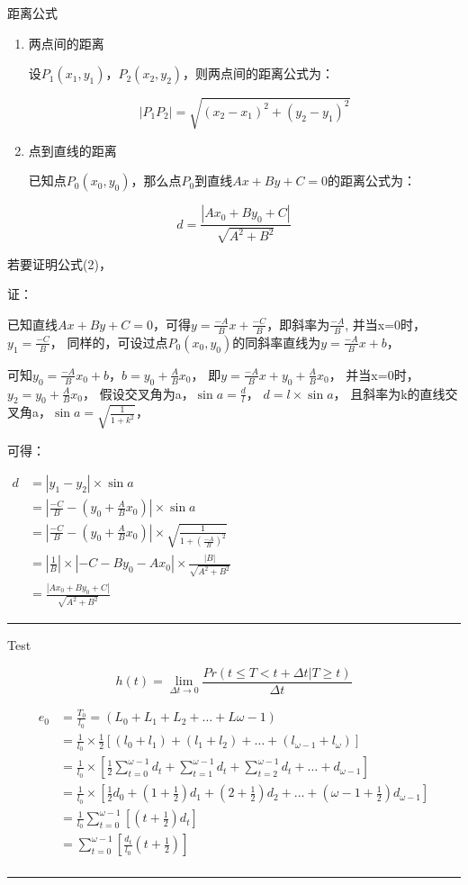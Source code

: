 \documentclass[
]{article}
\date{}
\begin{document}
距离公式

\begin{enumerate}
\def\labelenumi{\arabic{enumi}.}
\item
  两点间的距离

  设\(P_1(x_1,y_1)，P_2(x_2,y_2)\)，则两点间的距离公式为：

  \[|P_1P_2|=\sqrt{(x_2-x_1)^2+(y_2-y_1)^2}\]
\item
  点到直线的距离

  已知点\(P_0(x_0,y_0)\)，那么点\(P_0\)到直线\(Ax+By+C=0\)的距离公式为：
\end{enumerate}

\[d=\frac{|Ax_0+By_0+C|}{\sqrt{A^2+B^2}}\]

若要证明公式(2)，

证：

已知直线\(Ax+By+C=0\)，可得\(y=\frac{-A}{B}x+\frac{-C}{B}\)，即斜率为\(\frac{-A}{B}\),
并当x=0时，\(y_1=\frac{-C}{B}\)，
同样的，可设过点\(P_0(x_0,y_0)\)的同斜率直线为\(y=\frac{-A}{B}x+b\)，

可知\(y_0=\frac{-A}{B}x_0+b\)，\(b=y_0+\frac{A}{B}x_0\)，
即\(y=\frac{-A}{B}x+y_0+\frac{A}{B}x_0\)，
并当x=0时，\(y_2=y_0+\frac{A}{B}x_0\)，
假设交叉角为a，\(\sin a=\frac{d}{l}\)， \(d=l\times\sin a\)，
且斜率为k的直线交叉角a，\(\sin a=\sqrt{\frac{1}{1+k^2}}\)，

可得：

\(\begin{align*}
d &=|y_1 - y_2|\times\sin a \\
&=|\frac{-C}{B}-(y_0+\frac{A}{B}x_0)|\times\sin a \\
&=|\frac{-C}{B}-(y_0+\frac{A}{B}x_0)|\times\sqrt{\frac{1}{1+(\frac{-A}{B})^2}} \\
&=|\frac{1}{B}|\times|-C-By_0-Ax_0|\times\frac{|B|}{\sqrt{A^2+B^2}} \\
&=\frac{|Ax_0+By_0+C|}{\sqrt{A^2+B^2}}
\end{align*}\)

\begin{center}\rule{0.5\linewidth}{\linethickness}\end{center}

Test

\[h(t)={\lim_{\Delta t \to 0}}\frac{Pr(t\le T \lt t+\Delta t|T\ge t)}{\Delta t}\]

\begin{align*}
e_0 &=\frac{T_0}{l_0} =(L_0+L_1+L_2+\dots+L{\omega-1})\\
&= \frac{1}{l_0}\times\frac{1}{2}[(l_0+l_1)+(l_1+l_2)+\dots+(l_{\omega-1}+l_\omega)]\\
&= \frac{1}{l_0}\times[\frac{1}{2}\sum_{t=0}^{\omega-1}d_t+\sum_{t=1}^{\omega-1}d_t+\sum_{t=2}^{\omega-1}d_t+\dots+d_{\omega-1}]\\
&= \frac{1}{l_0}\times[\frac{1}{2}d_0+(1+\frac{1}{2})d_1+(2+\frac{1}{2})d_2+\dots+(\omega-1+\frac{1}{2})d_{\omega-1}] \\
&= \frac{1}{l_0}\sum_{t=0}^{\omega-1}[(t+\frac{1}{2})d_t]\\
&= \sum_{t=0}^{\omega-1}[\frac{d_t}{l_0}(t+\frac{1}{2})]\\
\end{align*}

\begin{center}\rule{0.5\linewidth}{\linethickness}\end{center}
\end{document}
